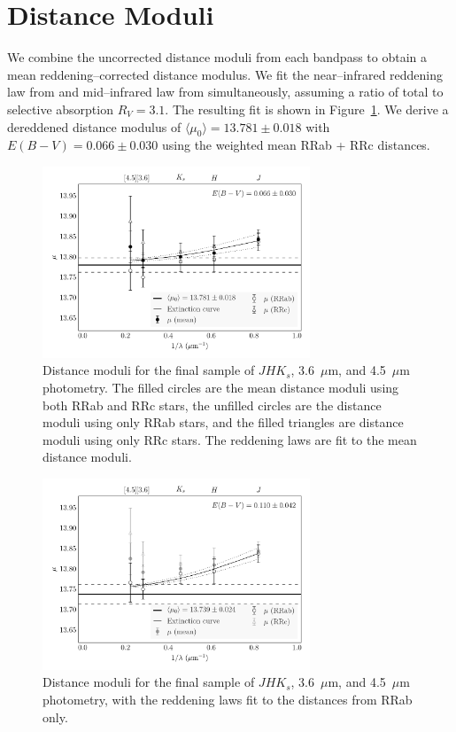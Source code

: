 \documentclass[a4paper,fleqn,usenatbib]{mnras}
\begin{document}
\section{Distance Moduli}
\label{sec:distance_moduli}

We combine the uncorrected distance moduli from each bandpass to obtain a mean reddening--corrected distance modulus. We fit the near--infrared reddening law from \citet{1989ApJ...345..245C} and mid--infrared law from \citet{2005ApJ...619..931I} simultaneously, assuming a ratio of total to selective absorption $R_V = 3.1$. The resulting fit is shown in Figure~\ref{fig:omegaCen_dist_m4_mean}. We derive a dereddened distance modulus of $\langle \mu_0 \rangle = 13.781 \pm 0.018$ with $E(B-V) = 0.066 \pm 0.030$ using the weighted mean RRab + RRc distances.

\begin{figure}
\begin{center}
\includegraphics[width=80mm]{reworked_fitting_code/final_plots/multiwavelength_distance_m4_clipped_mean.pdf}
\caption{Distance moduli for the final sample of $J\!H\!K_s$, 3.6~$\mu$m, and 4.5~$\mu$m photometry. The filled circles are the mean distance moduli using both RRab and RRc stars, the unfilled circles are the distance moduli using only RRab stars, and the filled triangles are distance moduli using only RRc stars. The reddening laws are fit to the mean distance moduli.}
\label{fig:omegaCen_dist_m4_mean}
\end{center}
\end{figure}

\begin{figure}
\begin{center}
\includegraphics[width=80mm]{reworked_fitting_code/final_plots/multiwavelength_distance_m4_clipped_ab.pdf}
\caption{Distance moduli for the final sample of $J\!H\!K_s$, 3.6~$\mu$m, and 4.5~$\mu$m photometry, with the reddening laws fit to the distances from RRab only.}
\label{fig:omegaCen_dist_m4_ab}
\end{center}
\end{figure}
\end{document}
